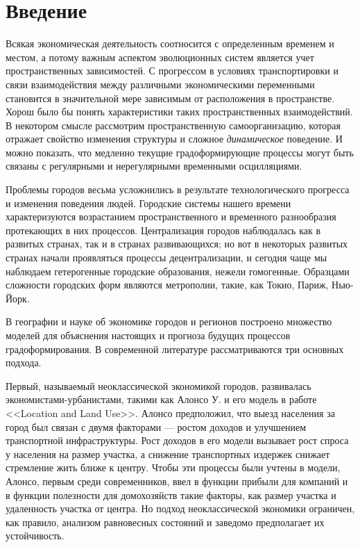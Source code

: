 \chapter{Введение}
Всякая экономическая деятельность соотносится с определенным временем и местом, а потому важным аспектом эволюционных систем является учет пространственных зависимостей. С прогрессом в условиях транспортировки и связи взаимодействия между различными экономическими переменными становится в значительной мере зависимым от расположения в пространстве. Хорош было бы понять характеристики таких пространственных взаимодействий. В некотором смысле рассмотрим пространственную самоорганизацию, которая отражает свойство изменения структуры и сложное \textit{динамическое} поведение. И можно показать, что медленно текущие градоформирующие процессы могут быть связаны с регулярными и нерегулярными временными осцилляциями.

Проблемы городов весьма усложнились в результате технологического прогресса и изменения поведения людей. Городские системы нашего времени характеризуются возрастанием пространственного и временного разнообразия протекающих в них  процессов. Централизация городов наблюдалась как в развитых странах, так и в странах развивающихся; но вот в некоторых развитых странах начали проявляться процессы децентрализации, и сегодня чаще мы наблюдаем гетерогенные городские образования, нежели гомогенные. Образцами сложности городских форм являются метрополии, такие, как Токио, Париж, Нью-Йорк.

В географии и науке об экономике городов и регионов построено множество моделей для объяснения настоящих и прогноза будущих процессов градоформирования. В современной литературе рассматриваются три основных подхода.

Первый, называемый неоклассической экономикой городов, развивалась экономистами-урбанистами, такими как Алонсо У. и его модель в работе <<Location and Land Use>>\cite{alonso}. Алонсо предположил, что выезд населения за город был связан с двумя факторами — ростом доходов и улучшением транспортной инфраструктуры. Рост доходов в его модели вызывает рост спроса у населения на размер участка, а снижение транспортных издержек снижает стремление жить ближе к центру. Чтобы эти процессы были учтены в модели, Алонсо, первым среди современников, ввел в функции прибыли для компаний и в функции полезности для домохозяйств такие факторы, как размер участка и удаленность участка от центра. Но подход неоклассической экономики ограничен, как правило, анализом равновесных состояний и заведомо предполагает их устойчивость.

